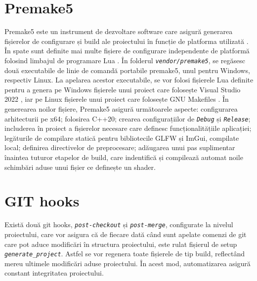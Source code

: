 \section{Premake5}
Premake5 este un instrument de dezvoltare software care asigură generarea fișierelor de configurare și build ale proiectului în funcție de platforma utilizată \cite{Premake5_citation}. În spate sunt definite mai multe fișiere de configurare independente de platformă folosind limbajul de programare Lua \cite{LUA_citation}. În folderul \textit{\texttt{vendor/premake5}}, se regăsesc două executabile de linie de comandă portabile premake5, unul pentru Windows, respectiv Linux. La apelarea acestor executabile, se vor folosi fișierele Lua definite pentru a genera pe Windows fișierele unui proiect care folosește Visual Studio 2022 \cite{VisualStudio-citation}, iar pe Linux fișierele unui proiect care folosește GNU Makefiles \cite{Make_citation}. În generearea noilor fișiere, Premake5 asigură următoarele aspecte: configurarea arhitecturii pe x64; folosirea C++20; crearea configurațiilor de \textit{\texttt{Debug}} și \textit{\texttt{Release}}; includerea în proiect a fișierelor necesare care definesc funcționalitățiile aplicației; legăturile de compilare statică pentru bibliotecile GLFW și ImGui, compilate local; definirea directivelor de preprocesare; adăugarea unui pas suplimentar înaintea tuturor etapelor de build, care indentifică și compilează automat noile schimbări aduse unui fișier ce definește un shader. 

\section{GIT hooks}
Există două git hooks, \textit{\texttt{post-checkout}} și \textit{\texttt{post-merge}}, configurate la nivelul proiectului, care vor asigura că de fiecare dată când sunt apelate comenzi de git care pot aduce modificări în structura proiectului, este rulat fișierul de setup \textit{\texttt{generate\_project}}. Astfel se vor regenera toate fișierele de tip build, reflectând mereu ultimele modificări aduse proiectului. În acest mod, automatizarea asigură constant integritatea proiectului. 


